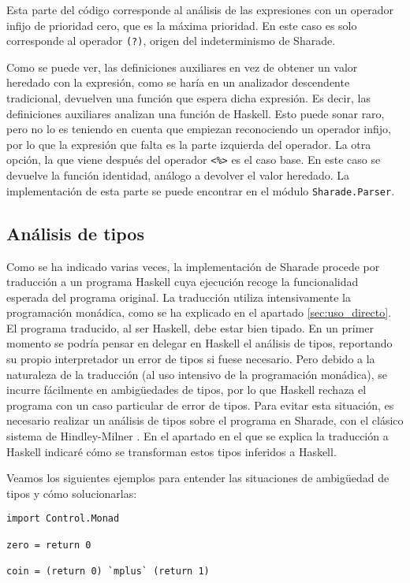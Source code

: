 \documentclass[class=article, crop=false]{standalone}
\begin{document}
Esta parte del código corresponde al análisis de las expresiones con un operador infijo de
prioridad cero, que es la máxima prioridad. En este caso es solo corresponde al operador
\verb`(?)`, origen del indeterminismo de Sharade.

Como se puede ver, las definiciones auxiliares en vez de obtener un valor heredado con la
expresión, como se haría en un analizador descendente tradicional, devuelven una función que
espera dicha expresión. Es decir, las definiciones auxiliares analizan una función de
Haskell. Esto puede sonar raro, pero no lo es teniendo en cuenta que empiezan reconociendo un
operador infijo, por lo que la expresión que falta es la parte izquierda del operador. La
otra opción, la que viene después del operador \verb`<%>` es el caso base. En este caso se
devuelve la función identidad, análogo a devolver el valor heredado. La implementación de
esta parte se puede encontrar en el módulo \verb`Sharade.Parser`.

\subsection{Análisis de tipos}

Como se ha indicado varias veces, la implementación de Sharade procede por traducción a un
programa Haskell cuya ejecución recoge la funcionalidad esperada del programa original. La
traducción utiliza intensivamente la programación monádica, como se ha explicado en el
apartado \ref{sec:uso_directo}. El programa traducido, al ser Haskell, debe estar bien
tipado. En un primer momento se podría pensar en delegar en Haskell el análisis de tipos,
reportando su propio interpretador un error de tipos si fuese necesario. Pero debido a la
naturaleza de la traducción (al uso intensivo de la programación monádica), se incurre
fácilmente en ambigüedades de tipos, por lo que Haskell rechaza el programa con un caso
particular de error de tipos. Para evitar esta situación, es necesario realizar un análisis
de tipos sobre el programa en Sharade, con el clásico sistema de
Hindley-Milner \cite{hindley1969principal}. En el apartado en el que se explica la traducción
a Haskell indicaré cómo se transforman estos tipos inferidos a Haskell.

Veamos los siguientes ejemplos para entender las situaciones de ambigüedad de tipos y cómo
solucionarlas:

\begin{verbatim}
import Control.Monad

zero = return 0

coin = (return 0) `mplus` (return 1)
\end{verbatim}
\end{document}

